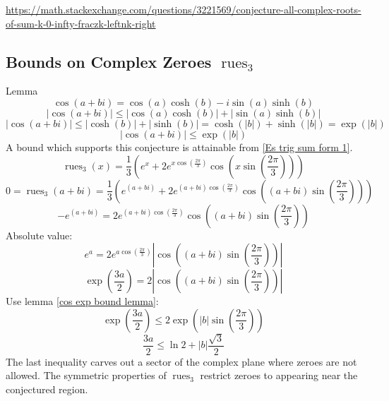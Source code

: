 \documentclass[]{article}
\DeclareMathOperator{\rues}{rues}
\newcommand{\pqty}[1]{{\left(#1\right)}}
\newcommand{\abs}[1]{{\left\lvert#1\right\rvert}}
\numberwithin{equation}{section}
\begin{document}
	\url{https://math.stackexchange.com/questions/3221569/conjecture-all-complex-roots-of-sum-k-0-infty-fraczk-leftnk-right}
	
	\subsection{Bounds on Complex Zeroes \(\rues_3\)}
	Lemma
	\begin{equation}
	\cos\pqty{a+bi}=\cos\pqty{a}\cosh\pqty{b}-i\sin\pqty{a}\sinh\pqty{b}
	\end{equation}
	\begin{equation}
	\abs{\cos\pqty{a+bi}} \leq \abs{\cos\pqty{a}\cosh\pqty{b}}+\abs{\sin\pqty{a}\sinh\pqty{b}}
	\end{equation}
	\begin{equation}
	\abs{\cos\pqty{a+bi}} \leq \abs{\cosh\pqty{b}}+\abs{\sinh\pqty{b}}
	= \cosh\pqty{\abs{b}}+{\sinh\pqty{\abs{b}}} = \exp\pqty{\abs{b}}
	\end{equation}
	\begin{equation}
	\label{cos exp bound lemma}
	\abs{\cos\pqty{a+bi}} \leq \exp\pqty{\abs{b}}
	\end{equation}
	A bound which supports this conjecture is attainable from \eqref{Es trig sum form 1}.
	\begin{equation}
	\rues_3\pqty{x}=
	\frac{1}{3}\pqty{
		e^x
		+2e^{x\cos\pqty{\frac{2\pi}{3}}} \cos\pqty{x\sin\pqty{\frac{2\pi}{3}}}
	}
	\end{equation}
	\begin{equation}
	0=\rues_3\pqty{a+bi}=
	\frac{1}{3}\pqty{
		e^\pqty{a+bi}
		+2e^{\pqty{a+bi}\cos\pqty{\frac{2\pi}{3}}} \cos\pqty{\pqty{a+bi}\sin\pqty{\frac{2\pi}{3}}}
	}
	\end{equation}
	\begin{equation}
	-e^\pqty{a+bi}=
	2e^{\pqty{a+bi}\cos\pqty{\frac{2\pi}{3}}} \cos\pqty{\pqty{a+bi}\sin\pqty{\frac{2\pi}{3}}}
	\end{equation}
	Absolute value:
	\begin{equation}
	e^{a}=
	2e^{{a}\cos\pqty{\frac{2\pi}{3}}} \abs{\cos\pqty{\pqty{a+bi}\sin\pqty{\frac{2\pi}{3}}}}
	\end{equation}
	\begin{equation}
	\exp\pqty{\frac{3a}{2}}=
	2 \abs{\cos\pqty{\pqty{a+bi}\sin\pqty{\frac{2\pi}{3}}}}
	\end{equation}
	Use lemma \eqref{cos exp bound lemma}:
	\begin{equation}
	\exp\pqty{\frac{3a}{2}} \leq
	2 {\exp\pqty{\abs{b}\sin\pqty{\frac{2\pi}{3}}}}
	\end{equation}
	\begin{equation}
	{\frac{3a}{2}} \leq
	\ln{2}+ {\abs{b}\frac{\sqrt{3}}{2}}
	\end{equation}
	The last inequality carves out a sector of the complex plane where zeroes are not allowed. The symmetric properties of \(\rues_3\) restrict zeroes to appearing near the conjectured region.
	
\end{document}
